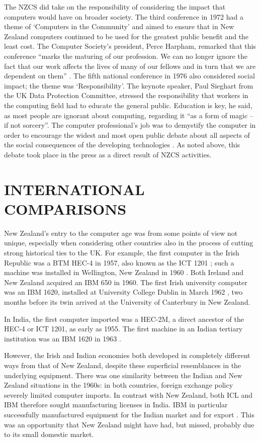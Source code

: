 \documentclass{IEEEcsmag}
\begin{document}
The NZCS did take on the responsibility of considering the impact that computers would have on 
broader society. The third conference in 1972 had a theme of ‘Computers in the Community’ and
aimed to ensure that in New Zealand computers continued to be used for the greatest public benefit
and the least cost. The Computer Society’s president, Perce Harpham, remarked that this conference
“marks the maturing of our profession. We can no longer ignore the fact that our work affects the lives 
of many of our fellows and in turn that we are dependent on them” \cite{Harpham1972}. The fifth national conference in 
1976 also considered social impact; the theme was  ‘Responsibility’.  The keynote speaker, Paul Sieghart 
from the UK Data Protection Committee, stressed the responsibility that workers in the computing field 
had to educate the general public. Education is key, he said, as most people are ignorant about computing, 
regarding it “as a form of magic – if not sorcery”. The computer professional’s job was to demystify the 
computer in order to encourage the widest and most open public debate about all aspects of the social 
consequences of the developing technologies \cite{Sieghart1976}.
\cbstart
As noted above, this debate took place in the press as a direct result of NZCS activities.
\vspace*{-8pt}
\section{INTERNATIONAL COMPARISONS}
\cbend
New Zealand’s entry to the computer age was from some points of view not unique,
especially when considering other countries also in the process of cutting strong historical ties to the UK.
For example, the first computer in the Irish Republic was a BTM HEC-4 in 1957,
also known as the ICT 1201 \cite{Ireland-first}; such a machine was installed in
Wellington, New Zealand in 1960 \cite{FirstCinNZ}. Both Ireland and New Zealand
acquired an IBM 650 in 1960. The first Irish university computer was an IBM 1620, 
installed at University College Dublin in March 1962 \cite{Ireland-first}, two months before its twin
arrived at the University of Canterbury in New Zealand.

In India, the first computer imported was a HEC-2M, a direct ancestor of the HEC-4 or ICT 1201,
as early as 1955. The first machine in an Indian tertiary institution was an
IBM 1620 in 1963 \cite{Rajaraman-2015}. 

However, the Irish and Indian economies
both developed in completely different ways from that of New Zealand, despite
these superficial resemblances in the underlying equipment.
There was one similarity between the Indian and New Zealand
situations in the 1960s: in both countries, foreign exchange policy
severely limited computer imports. In contrast with New Zealand, both ICL 
and IBM therefore sought manufacturing licenses in India. IBM in particular successfully
manufactured equipment for the Indian market and for export \cite{Rajaraman-2015}.
\cbstart 
This was an opportunity that New Zealand might have had, but missed, probably due to its small domestic market.
\end{document}
